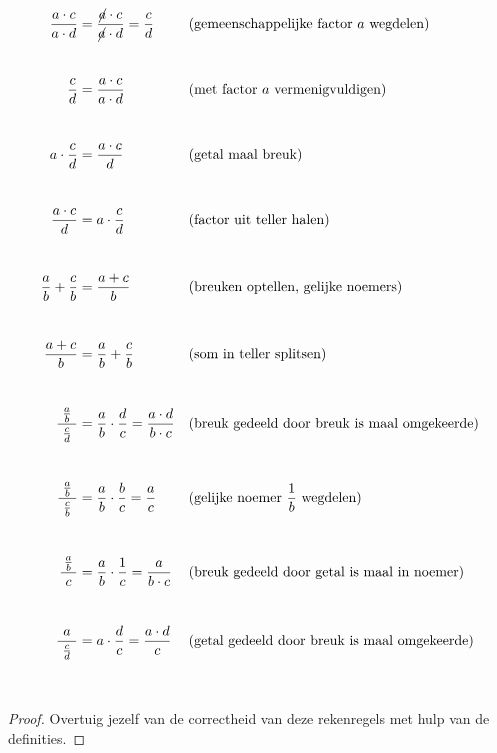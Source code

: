 \documentclass{ximera}
\begin{document}
\begin{proposition}\label{eig:rekenregels_breuken}\nl
 
{
\allowdisplaybreaks
\addtolength{\jot}{-2mm}  %
\begin{align*}
        \frac{a\cdot c}{a\cdot d} &=    \frac{\cancel{a}\cdot c}{\cancel{a}\cdot d} = \frac{c}{d}
            && \text{(gemeenschappelijke factor $a$ wegdelen)} \\[3mm]
            \\
         \frac{c}{d}    &= \frac{a\cdot c}{a\cdot d}
            && \text{(met factor $a$ vermenigvuldigen)} \\[3mm]
            \\
        a\cdot \frac{c}{d}   &= \frac{a\cdot c}{d}
            && \text{(getal maal breuk)}  \\[3mm]
            \\
        \frac{a\cdot c}{d}   &= a\cdot \frac{c}{d}
            && \text{(factor uit teller halen)} \\[3mm]
            \\
        \frac{a}{b}+\frac{c}{b}  &= \frac{a+c}{b}
            && \text{(breuken optellen, gelijke noemers)} \\[3mm]
            \\
        \frac{a+c}{b} &= \frac{a}{b}+\frac{c}{b}
            && \text{(som in teller splitsen)}\\[3mm] %
            \\
        \frac{\frac{a}{b}}{\ \frac{c}{d}\ } &= \frac ab \cdot \frac dc =  \frac{a\cdot d}{b\cdot c}
            && \text{(breuk gedeeld door breuk is maal omgekeerde)}\\[3mm]
            \\
        \frac{\frac{a}{b}}{\ \frac{c}{b}\ } &= \frac ab \cdot \frac bc =  \frac{a}{c}
            && \text{(gelijke noemer $\frac 1b$  wegdelen)}\\[3mm]
            \\
        \frac{\frac{a}{b}}{\ c\ } &= \frac ab \cdot \frac 1c = \frac{a}{b\cdot c}
            && \text{(breuk gedeeld door getal is maal in noemer)}\\[3mm]
            \\
        \frac{a}{\ \frac{c}{d}\ } &= a\cdot \frac dc = \frac{a\cdot d}{c}
            && \text{(getal gedeeld door breuk is maal omgekeerde)}\\[3mm]
            \\
\end{align*}
}

\begin{proof}
    Overtuig jezelf van de correctheid van deze rekenregels met hulp van de definities. 
\end{proof}
\end{proposition}
\end{document}
